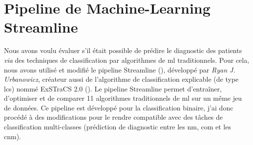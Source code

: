 \section{Pipeline de Machine-Learning Streamline}
Nous avons voulu évaluer s'il était possible de prédire le diagnostic des patients \textit{via} des techniques de classification par algorithmes de \gls{ml} traditionnels. Pour cela, nous avons utilisé et modifié le pipeline Streamline (\cite{urbanowicz_streamline_2023}), développé par \textit{Ryan J. Urbanowicz}, créateur aussi de l'algorithme de classification explicable (de type \gls{lcs}) nommé ExSTraCS 2.0 (\cite{urbanowicz_exstracs_2015}).
Le pipeline Streamline permet d'entraîner, d'optimiser et de comparer 11 algorithmes traditionnels de \gls{ml} sur un même jeu de données. Ce pipeline est développé pour la classification binaire, j'ai donc procédé à des modifications pour le rendre compatible avec des tâches de classification multi-classes (prédiction de diagnostic entre les \gls{nm}, \gls{com} et les \gls{cnm}).
